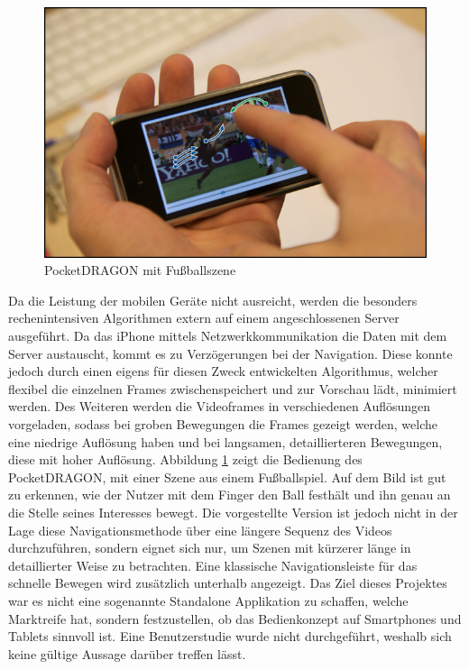 \documentclass[11pt,a4paper]{report}
\begin{document}
\begin{figure}[h]
\begin{center}
\includegraphics[scale=1.2]{./images/11.png}
\caption{PocketDRAGON mit Fußballszene \cite{karrer2009pocketdragon}}
\label{pocket_dragon}
\end{center}
\end{figure}Da die Leistung der mobilen Geräte nicht ausreicht, werden die besonders rechenintensiven Algorithmen extern auf einem angeschlossenen Server ausgeführt. Da das iPhone mittels Netzwerkkommunikation die Daten mit dem Server austauscht, kommt es zu Verzögerungen bei der Navigation. Diese konnte jedoch durch einen eigens für diesen Zweck entwickelten Algorithmus, welcher flexibel die einzelnen Frames zwischenspeichert und zur Vorschau lädt, minimiert werden. Des Weiteren werden die Videoframes in verschiedenen Auflösungen vorgeladen, sodass bei groben Bewegungen die Frames gezeigt werden, welche eine niedrige Auflösung haben und bei langsamen, detaillierteren Bewegungen, diese mit hoher Auflösung. Abbildung \ref{pocket_dragon} zeigt die Bedienung des PocketDRAGON, mit einer Szene aus einem Fußballspiel. Auf dem Bild ist gut zu erkennen, wie der Nutzer mit dem Finger den Ball festhält und ihn genau an die Stelle seines Interesses bewegt. Die vorgestellte Version ist jedoch nicht in der Lage diese Navigationsmethode über eine längere Sequenz des Videos durchzuführen, sondern eignet sich nur, um Szenen mit kürzerer länge in detaillierter Weise zu betrachten. Eine klassische Navigationsleiste für das schnelle Bewegen wird zusätzlich unterhalb angezeigt. Das Ziel dieses Projektes war es nicht eine sogenannte Standalone Applikation zu schaffen, welche Marktreife hat, sondern festzustellen, ob das Bedienkonzept auf Smartphones und Tablets sinnvoll ist. Eine Benutzerstudie wurde nicht durchgeführt, weshalb sich keine gültige Aussage darüber treffen lässt.
\end{document}

